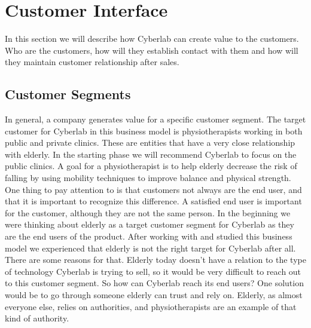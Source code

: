 \section{Customer Interface}
In this section we will describe how Cyberlab can create value to the customers. Who are the customers, how will they establish contact with them and how will they maintain customer relationship after sales.
\subsection{Customer Segments}
In general, a company generates value for a specific customer segment. The target customer for Cyberlab in this business model is physiotherapists working in both public and private clinics.  These are entities that have a very close relationship with elderly. In the starting phase we will recommend Cyberlab to focus on the public clinics. A goal for a physiotherapist is to help elderly decrease the risk of falling by using mobility techniques to improve balance and physical strength. One thing to pay attention to is that customers not always are the end user, and that it is important to recognize this difference. A satisfied end user is important for the customer, although they are not the same person. In the beginning we were thinking about elderly as a target customer segment for Cyberlab as they are the end users of the product. After working with and studied this business model we experienced that elderly is not the right target for Cyberlab after all. There are some reasons for that. Elderly today doesn’t have a relation to the type of technology Cyberlab is trying to sell, so it would be very difficult to reach out to this customer segment. So how can Cyberlab reach its end users?  One solution would be to go through someone elderly can trust and rely on. Elderly, as almost everyone else, relies on authorities, and physiotherapists are an example of that kind of authority.  
